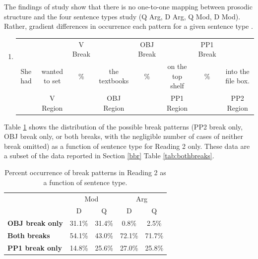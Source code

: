 \documentclass[12pt,oneside]{book}
\providecommand{\tightlist}{%
  \setlength{\itemsep}{0pt}\setlength{\parskip}{0pt}}
\begin{document}
The findings of  study show that there is no one-to-one mapping between prosodic structure and the four sentence types  study (Q Arg, D Arg, Q Mod, D Mod). Rather,   gradient differences in occurrence  each pattern for a given sentence type . 

\begin{enumerate}
\def\labelenumi{(\arabic{enumi})}
\setcounter{enumi}{51}
\tightlist
\item
  \begingroup
  \setlength{\tabcolsep}{1pt}

  \begin{tabular}{cccccccc}
    & & \footnotesize V Break & & \footnotesize OBJ Break & & \footnotesize PP1 Break & \\
    She had & wanted to set & \% & the textbooks & \% & on the top shelf & \% & into the file box. \\
    \cmidrule(r){2-2} \cmidrule(r){4-4} \cmidrule(r){6-6} \cmidrule(r){8-8} 
    & \footnotesize V Region & & \footnotesize OBJ Region & & \footnotesize PP1 Region & & PP2 Region \\
  \end{tabular}
    \endgroup
\end{enumerate}

Table \ref{tab:combobr} shows the distribution of the possible  break patterns (PP2 break only, OBJ break only, or both breaks, with the negligible number of cases of neither break omitted) as a function of sentence type for Reading 2 only. These data are a subset of the data reported in Section \ref{bbr} Table \ref{tab:bothbreaks}.

\begin{table}[!h]

\caption{\label{tab:combobr}Percent occurrence of break patterns in Reading 2 as a function of sentence type.}
\centering
\begin{tabular}{>{\bfseries}lcccc}
\toprule
\multicolumn{1}{c}{ } & \multicolumn{2}{c}{Mod} & \multicolumn{2}{c}{Arg} \\
\cmidrule(l{3pt}r{3pt}){2-3} \cmidrule(l{3pt}r{3pt}){4-5}
  & D & Q & D & Q\\
\midrule
OBJ break only & 31.1\% & 31.4\% & 0.8\% & 2.5\%\\
Both breaks & 54.1\% & 43.0\% & 72.1\% & 71.7\%\\
PP1 break only & 14.8\% & 25.6\% & 27.0\% & 25.8\%\\
\bottomrule
\end{tabular}
\end{table}
\end{document}
